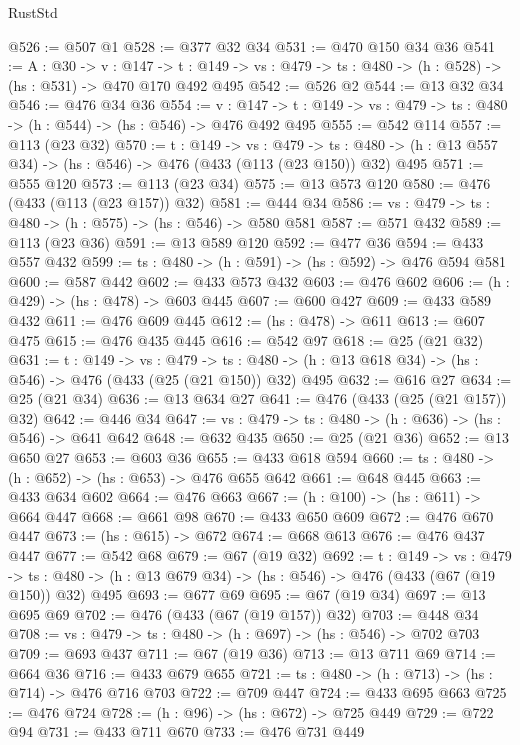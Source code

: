 \begin{lexlean}{RustStd}
\begin{coremodule}
@526 := @507 @1
@528 := @377 @32 @34
@531 := @470 @150 @34 @36
@541 := {A : @30} ->
  {v : @147} ->
  {t : @149} -> {vs : @479} -> {ts : @480} -> (h : @528) -> (hs : @531) -> @470 @170 @492 @495
@542 := @526 @2
@544 := @13 @32 @34
@546 := @476 @34 @36
@554 := {v : @147} ->
  {t : @149} -> {vs : @479} -> {ts : @480} -> (h : @544) -> (hs : @546) -> @476 @492 @495
@555 := @542 @114
@557 := @113 (@23 @32)
@570 := {t : @149} ->
  {vs : @479} ->
  {ts : @480} -> (h : @13 @557 @34) -> (hs : @546) -> @476 (@433 (@113 (@23 @150)) @32) @495
@571 := @555 @120
@573 := @113 (@23 @34)
@575 := @13 @573 @120
@580 := @476 (@433 (@113 (@23 @157)) @32)
@581 := @444 @34
@586 := {vs : @479} -> {ts : @480} -> (h : @575) -> (hs : @546) -> @580 @581
@587 := @571 @432
@589 := @113 (@23 @36)
@591 := @13 @589 @120
@592 := @477 @36
@594 := @433 @557 @432
@599 := {ts : @480} -> (h : @591) -> (hs : @592) -> @476 @594 @581
@600 := @587 @442
@602 := @433 @573 @432
@603 := @476 @602
@606 := (h : @429) -> (hs : @478) -> @603 @445
@607 := @600 @427
@609 := @433 @589 @432
@611 := @476 @609 @445
@612 := (hs : @478) -> @611
@613 := @607 @475
@615 := @476 @435 @445
@616 := @542 @97
@618 := @25 (@21 @32)
@631 := {t : @149} ->
  {vs : @479} ->
  {ts : @480} -> (h : @13 @618 @34) -> (hs : @546) -> @476 (@433 (@25 (@21 @150)) @32) @495
@632 := @616 @27
@634 := @25 (@21 @34)
@636 := @13 @634 @27
@641 := @476 (@433 (@25 (@21 @157)) @32)
@642 := @446 @34
@647 := {vs : @479} -> {ts : @480} -> (h : @636) -> (hs : @546) -> @641 @642
@648 := @632 @435
@650 := @25 (@21 @36)
@652 := @13 @650 @27
@653 := @603 @36
@655 := @433 @618 @594
@660 := {ts : @480} -> (h : @652) -> (hs : @653) -> @476 @655 @642
@661 := @648 @445
@663 := @433 @634 @602
@664 := @476 @663
@667 := (h : @100) -> (hs : @611) -> @664 @447
@668 := @661 @98
@670 := @433 @650 @609
@672 := @476 @670 @447
@673 := (hs : @615) -> @672
@674 := @668 @613
@676 := @476 @437 @447
@677 := @542 @68
@679 := @67 (@19 @32)
@692 := {t : @149} ->
  {vs : @479} ->
  {ts : @480} -> (h : @13 @679 @34) -> (hs : @546) -> @476 (@433 (@67 (@19 @150)) @32) @495
@693 := @677 @69
@695 := @67 (@19 @34)
@697 := @13 @695 @69
@702 := @476 (@433 (@67 (@19 @157)) @32)
@703 := @448 @34
@708 := {vs : @479} -> {ts : @480} -> (h : @697) -> (hs : @546) -> @702 @703
@709 := @693 @437
@711 := @67 (@19 @36)
@713 := @13 @711 @69
@714 := @664 @36
@716 := @433 @679 @655
@721 := {ts : @480} -> (h : @713) -> (hs : @714) -> @476 @716 @703
@722 := @709 @447
@724 := @433 @695 @663
@725 := @476 @724
@728 := (h : @96) -> (hs : @672) -> @725 @449
@729 := @722 @94
@731 := @433 @711 @670
@733 := @476 @731 @449

\end{coremodule}
\end{lexlean}
